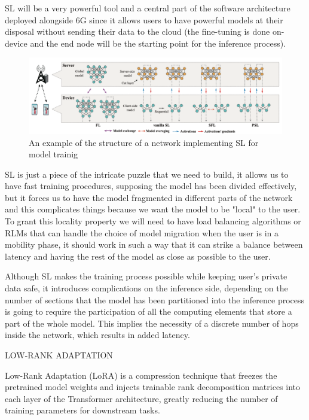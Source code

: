 SL will be a very powerful tool and a central part of the software architecture deployed alongside
6G since it allows users to have powerful models at their disposal without sending their data to the
cloud (the fine-tuning is done on-device and the end node will be the starting point for the
inference process).
\begin{figure}
	\center
	\label{img:split-learning}
	\includegraphics[scale=0.65]{figures/split-learning.png}
	\caption{An example of the structure of a network implementing SL for model trainig
		\cite{split-learning}}
\end{figure}
SL is just a piece of the intricate puzzle that we need to build, it allows us to have fast training
procedures, supposing the model has been divided effectively, but it forces us to have the model
fragmented in different parts of the network and this complicates things because we want the model
to be "local" to the user.
To grant this locality property we will need to have load balancing algorithms or RLMs that can
handle the choice of model migration when the user is in a mobility phase, it should work in such a
way that it can strike a balance between latency and having the rest of the model as close as
possible to the user.

Although SL makes the training process possible while keeping user's private data safe, it
introduces complications on the inference side, depending on the number of sections that the model
has been partitioned into the inference process is going to require the participation of all the
computing elements that store a part of the whole model. This implies the necessity of a discrete
number of hops inside the network, which results in added latency.

\bigskip
\noindent
LOW-RANK ADAPTATION

Low-Rank Adaptation (LoRA) is a compression technique that freezes the pretrained model weights and injects
trainable rank decomposition matrices into each layer of the Transformer architecture, greatly
reducing the number of training parameters for downstream tasks.

